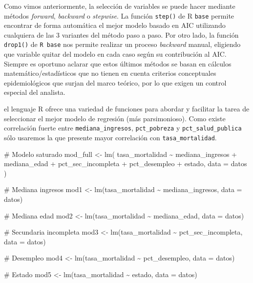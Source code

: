 \documentclass[
  spanish,
  a4paper,
]{scrbook}
\newenvironment{Shaded}{\begin{snugshade}}{\end{snugshade}}
\newcommand{\AttributeTok}[1]{\textcolor[rgb]{0.40,0.45,0.13}{#1}}
\newcommand{\CommentTok}[1]{\textcolor[rgb]{0.37,0.37,0.37}{#1}}
\newcommand{\FunctionTok}[1]{\textcolor[rgb]{0.28,0.35,0.67}{#1}}
\newcommand{\NormalTok}[1]{\textcolor[rgb]{0.00,0.23,0.31}{#1}}
\newcommand{\OtherTok}[1]{\textcolor[rgb]{0.00,0.23,0.31}{#1}}
\newcommand{\SpecialCharTok}[1]{\textcolor[rgb]{0.37,0.37,0.37}{#1}}
\begin{document}
Como vimos anteriormente, la selección de variables se puede hacer
mediante métodos \emph{forward}, \emph{backward} o \emph{stepwise}. La
función \texttt{step()} de R \texttt{base} permite encontrar de forma
automática el mejor modelo basado en AIC utilizando cualquiera de las 3
variantes del método paso a paso. Por otro lado, la función
\texttt{drop1()} de \texttt{R\ base} nos permite realizar un proceso
\emph{backward} manual, eligiendo que variable quitar del modelo en cada
caso según su contribución al AIC. Siempre es oportuno aclarar que estos
últimos métodos se basan en cálculos matemático/estadísticos que no
tienen en cuenta criterios conceptuales epidemiológicos que surjan del
marco teórico, por lo que exigen un control especial del analista.

el lenguaje R ofrece una variedad de funciones para abordar y facilitar
la tarea de seleccionar el mejor modelo de regresión (más parsimonioso).
Como existe correlación fuerte entre \texttt{mediana\_ingresos},
\texttt{pct\_pobreza} y \texttt{pct\_salud\_publica} sólo usaremos la
que presente mayor correlación con \texttt{tasa\_mortalidad}.

\begin{Shaded}
\begin{Highlighting}[]
\CommentTok{\# Modelo saturado}
\NormalTok{mod\_full }\OtherTok{\textless{}{-}} \FunctionTok{lm}\NormalTok{(}
\NormalTok{  tasa\_mortalidad }\SpecialCharTok{\textasciitilde{}}\NormalTok{ mediana\_ingresos }\SpecialCharTok{+}
\NormalTok{    mediana\_edad }\SpecialCharTok{+}
\NormalTok{    pct\_sec\_incompleta }\SpecialCharTok{+}
\NormalTok{    pct\_desempleo }\SpecialCharTok{+}
\NormalTok{    estado,}
  \AttributeTok{data =}\NormalTok{ datos}
\NormalTok{)}

\CommentTok{\# Mediana ingresos}
\NormalTok{mod1 }\OtherTok{\textless{}{-}} \FunctionTok{lm}\NormalTok{(tasa\_mortalidad }\SpecialCharTok{\textasciitilde{}}\NormalTok{ mediana\_ingresos, }\AttributeTok{data =}\NormalTok{ datos)}

\CommentTok{\# Mediana edad}
\NormalTok{mod2 }\OtherTok{\textless{}{-}} \FunctionTok{lm}\NormalTok{(tasa\_mortalidad }\SpecialCharTok{\textasciitilde{}}\NormalTok{ mediana\_edad, }\AttributeTok{data =}\NormalTok{ datos)}

\CommentTok{\# Secundaria incompleta}
\NormalTok{mod3 }\OtherTok{\textless{}{-}} \FunctionTok{lm}\NormalTok{(tasa\_mortalidad }\SpecialCharTok{\textasciitilde{}}\NormalTok{ pct\_sec\_incompleta, }\AttributeTok{data =}\NormalTok{ datos)}

\CommentTok{\# Desempleo}
\NormalTok{mod4 }\OtherTok{\textless{}{-}} \FunctionTok{lm}\NormalTok{(tasa\_mortalidad }\SpecialCharTok{\textasciitilde{}}\NormalTok{ pct\_desempleo, }\AttributeTok{data =}\NormalTok{ datos)}

\CommentTok{\# Estado}
\NormalTok{mod5 }\OtherTok{\textless{}{-}} \FunctionTok{lm}\NormalTok{(tasa\_mortalidad }\SpecialCharTok{\textasciitilde{}}\NormalTok{ estado, }\AttributeTok{data =}\NormalTok{ datos)}
\end{Highlighting}
\end{Shaded}
\end{document}
